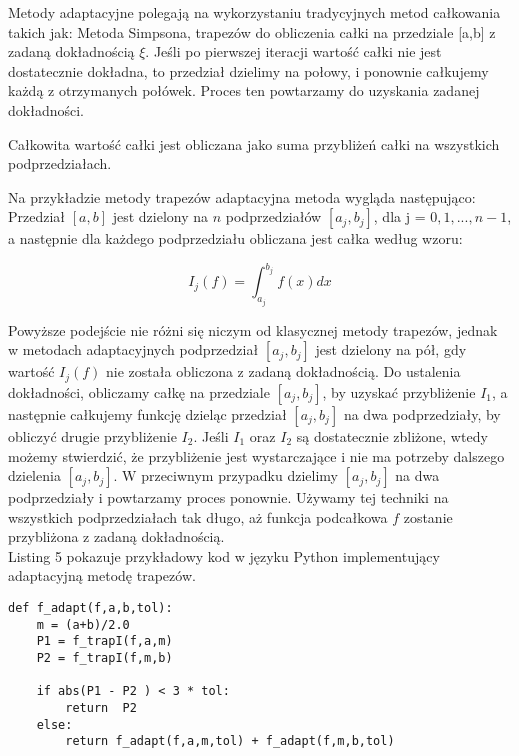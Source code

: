 \documentclass[12pt,twoside]{article}
\begin{document}
Metody adaptacyjne polegają na wykorzystaniu tradycyjnych metod całkowania takich jak: Metoda Simpsona, trapezów do obliczenia całki na przedziale [a,b] z zadaną dokładnością $\xi$. Jeśli po pierwszej iteracji wartość całki nie jest dostatecznie dokładna, to przedział dzielimy na połowy, i ponownie całkujemy każdą z otrzymanych połówek. Proces ten powtarzamy do uzyskania zadanej dokładności\cite{adaptive2}.

Całkowita wartość całki jest obliczana jako suma przybliżeń całki na wszystkich podprzedziałach.

Na przykładzie metody trapezów adaptacyjna metoda wygląda następująco:
Przedział $[a,b]$ jest dzielony na $n$ podprzedziałów $[a_j,b_j]$, dla j = $0,1,...,n-1$, a następnie dla każdego podprzedziału obliczana jest całka według wzoru:

\begin{equation}
I_j(f) = \int_{a_j}^{b_j}f(x) dx
\label{Eq:rownanie}
\end{equation}

Powyższe podejście nie różni się niczym od klasycznej metody trapezów, jednak w metodach adaptacyjnych podprzedział $[a_j,b_j]$ jest dzielony na pół, gdy wartość $I_j(f)$ nie została obliczona z zadaną dokładnością.
Do ustalenia dokładności, obliczamy całkę na przedziale $[a_j,b_j]$, by uzyskać przybliżenie $I_1$, a następnie całkujemy funkcję dzieląc przedział $[a_j,b_j]$ na dwa podprzedziały, by obliczyć drugie przybliżenie $I_2$. Jeśli $I_1$ oraz $I_2$ są dostatecznie zbliżone, wtedy możemy stwierdzić, że przybliżenie jest wystarczające i nie ma potrzeby dalszego dzielenia $[a_j,b_j]$. W przeciwnym przypadku dzielimy $[a_j,b_j]$ na dwa podprzedziały i powtarzamy proces ponownie. Używamy tej techniki na wszystkich podprzedziałach tak długo, aż funkcja podcałkowa $f$ zostanie przybliżona z zadaną dokładnością\cite{adaptive3}.\\

Listing 5 pokazuje przykładowy kod w języku Python implementujący adaptacyjną metodę trapezów.

\begin{lstlisting}[caption={Kod w języku python implementujący metodę simpsona}]
def f_adapt(f,a,b,tol):
    m = (a+b)/2.0
    P1 = f_trapI(f,a,m)
    P2 = f_trapI(f,m,b)

    if abs(P1 - P2 ) < 3 * tol:
        return  P2
    else:
        return f_adapt(f,a,m,tol) + f_adapt(f,m,b,tol)

\end{lstlisting}
\label{Listing 5}
\end{document}
